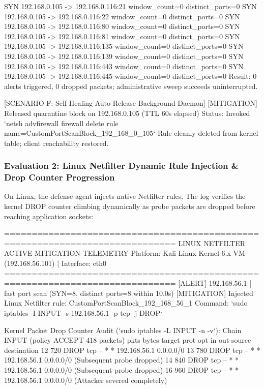 \begin{logbox}
  SYN 192.168.0.105 -> 192.168.0.116:21    window_count=0   distinct_ports=0
  SYN 192.168.0.105 -> 192.168.0.116:22    window_count=0   distinct_ports=0
  SYN 192.168.0.105 -> 192.168.0.116:80    window_count=0   distinct_ports=0
  SYN 192.168.0.105 -> 192.168.0.116:81    window_count=0   distinct_ports=0
  SYN 192.168.0.105 -> 192.168.0.116:135   window_count=0   distinct_ports=0
  SYN 192.168.0.105 -> 192.168.0.116:139   window_count=0   distinct_ports=0
  SYN 192.168.0.105 -> 192.168.0.116:443   window_count=0   distinct_ports=0
  SYN 192.168.0.105 -> 192.168.0.116:445   window_count=0   distinct_ports=0
  Result: 0 alerts triggered, 0 dropped packets; administrative sweep succeeds uninterrupted.

[SCENARIO F: Self-Healing Auto-Release Background Daemon]
  [MITIGATION] Released quarantine block on 192.168.0.105 (TTL 60s elapsed)
  Status: Invoked `netsh advfirewall firewall delete rule name=CustomPortScanBlock_192_168_0_105`
          Rule cleanly deleted from kernel table; client reachability restored.
\end{logbox}

\subsubsection{Evaluation 2: Linux Netfilter Dynamic Rule Injection \& Drop Counter Progression}
On Linux, the defense agent injects native Netfilter rules. The log verifies the kernel DROP counter
climbing dynamically as probe packets are dropped before reaching application sockets:

\begin{logbox}
=============================================================================
LINUX NETFILTER ACTIVE MITIGATION TELEMETRY
Platform: Kali Linux Kernel 6.x VM (192.168.56.101) | Interface: eth0
=============================================================================
[ALERT] 192.168.56.1 | fast port scan (SYN=8, distinct ports=8 within 10.0s)
[MITIGATION] Injected Linux Netfilter rule: CustomPortScanBlock_192_168_56_1
Command: `sudo iptables -I INPUT -s 192.168.56.1 -p tcp -j DROP`

Kernel Packet Drop Counter Audit (`sudo iptables -L INPUT -n -v`):
  Chain INPUT (policy ACCEPT 418 packets)
  pkts bytes target     prot opt in     out     source          destination
    12   720 DROP       tcp  --  *      *       192.168.56.1    0.0.0.0/0
    13   780 DROP       tcp  --  *      *       192.168.56.1    0.0.0.0/0  (Subsequent probe dropped)
    14   840 DROP       tcp  --  *      *       192.168.56.1    0.0.0.0/0  (Subsequent probe dropped)
    16   960 DROP       tcp  --  *      *       192.168.56.1    0.0.0.0/0  (Attacker severed completely)
\end{logbox}

